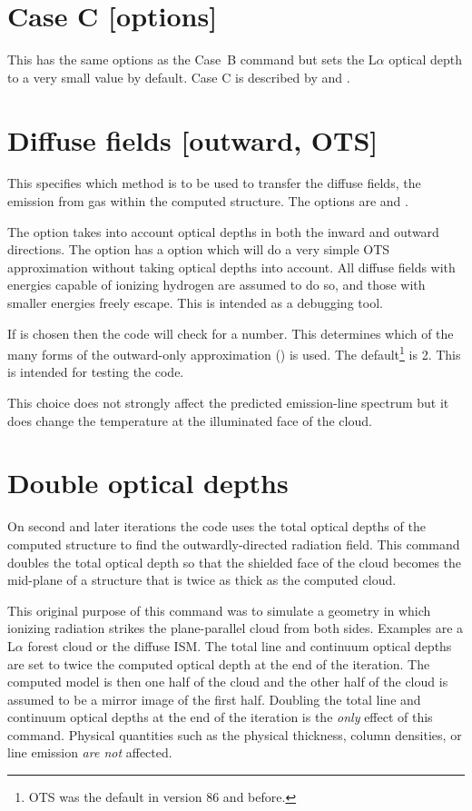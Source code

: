 \section{Case C [options]}

This has the same options as the Case~B command but sets the
L$\alpha$ optical depth to a very small value by default.
Case C is described by \citet{Ferland1999} and
\citet{LuridianaEtAl09}.

\section{Diffuse fields [outward, OTS]}

This specifies which method is to be used to transfer the diffuse fields,
the emission from gas within the computed structure.
The options are  and .

The  option takes into account optical depths
in both the inward and outward directions.
The  option has a  option which will
do a very simple OTS approximation without taking optical depths into
account.
All diffuse fields with energies capable of ionizing hydrogen
are assumed to do so, and those with smaller energies freely escape.
This is intended as a debugging tool.

If  is chosen then the code will check for a number.
This determines which of the many forms of the outward-only
approximation (\citealp{Tarter1967}) is used.
The default\footnote{OTS was the default in version 86 and before.} is 2.  This is intended for testing the code.

This choice does not strongly affect the predicted emission-line spectrum
but it does change the temperature at the illuminated face of the cloud.

\section{Double optical depths}

On second and later iterations the code uses the total optical depths
of the computed structure to find the outwardly-directed radiation field.
This command doubles the total optical depth so that the shielded face of
the cloud becomes the mid-plane of a structure that is twice as thick as
the computed cloud.

This original purpose of this command was to simulate a geometry in which
ionizing radiation strikes the plane-parallel cloud from both sides.
Examples are a L$\alpha$ forest cloud or the diffuse ISM.
The total line and
continuum optical depths are set to twice the computed optical depth at
the end of the iteration.
The computed model is then one half of the cloud
and the other half of the cloud is assumed to be a mirror image
of the first half.
Doubling the total line and continuum optical depths at the end of
the iteration is the \emph{only} effect of this command.
Physical quantities such
as the physical thickness, column densities, or line emission
\emph{are not} affected.

